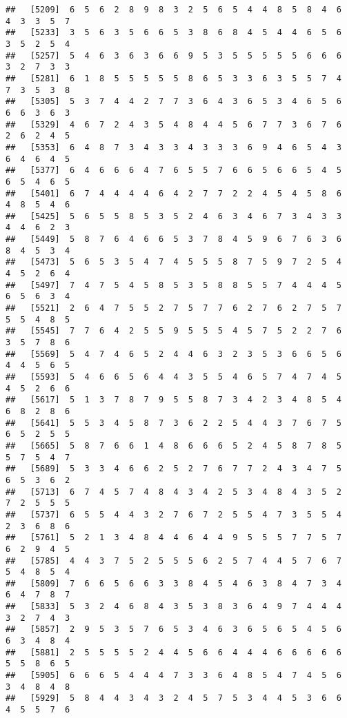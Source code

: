 \documentclass[
]{book}
\begin{document}
\begin{verbatim}
##   [5209]  6  5  6  2  8  9  8  3  2  5  6  5  4  4  8  5  8  4  6  4  3  3  5  7
##   [5233]  3  5  6  3  5  6  6  5  3  8  6  8  4  5  4  4  6  5  6  3  5  2  5  4
##   [5257]  5  4  6  3  6  3  6  6  9  5  3  5  5  5  5  5  6  6  6  3  2  7  3  3
##   [5281]  6  1  8  5  5  5  5  5  8  6  5  3  3  6  3  5  5  7  4  7  3  5  3  8
##   [5305]  5  3  7  4  4  2  7  7  3  6  4  3  6  5  3  4  6  5  6  6  6  3  6  3
##   [5329]  4  6  7  2  4  3  5  4  8  4  4  5  6  7  7  3  6  7  6  2  6  2  4  5
##   [5353]  6  4  8  7  3  4  3  3  4  3  3  3  6  9  4  6  5  4  3  6  4  6  4  5
##   [5377]  6  4  6  6  6  4  7  6  5  5  7  6  6  5  6  6  5  4  5  6  5  4  6  5
##   [5401]  6  7  4  4  4  4  6  4  2  7  7  2  2  4  5  4  5  8  6  4  8  5  4  6
##   [5425]  5  6  5  5  8  5  3  5  2  4  6  3  4  6  7  3  4  3  3  4  4  6  2  3
##   [5449]  5  8  7  6  4  6  6  5  3  7  8  4  5  9  6  7  6  3  6  8  4  5  3  4
##   [5473]  5  6  5  3  5  4  7  4  5  5  5  8  7  5  9  7  2  5  4  4  5  2  6  4
##   [5497]  7  4  7  5  4  5  8  5  3  5  8  8  5  5  7  4  4  4  5  6  5  6  3  4
##   [5521]  2  6  4  7  5  5  2  7  5  7  7  6  2  7  6  2  7  5  7  5  5  4  8  5
##   [5545]  7  7  6  4  2  5  5  9  5  5  5  4  5  7  5  2  2  7  6  3  5  7  8  6
##   [5569]  5  4  7  4  6  5  2  4  4  6  3  2  3  5  3  6  6  5  6  4  4  5  6  5
##   [5593]  5  4  6  6  5  6  4  4  3  5  5  4  6  5  7  4  7  4  5  4  5  2  6  6
##   [5617]  5  1  3  7  8  7  9  5  5  8  7  3  4  2  3  4  8  5  4  6  8  2  8  6
##   [5641]  5  5  3  4  5  8  7  3  6  2  2  5  4  4  3  7  6  7  5  6  5  2  5  5
##   [5665]  5  8  7  6  6  1  4  8  6  6  6  5  2  4  5  8  7  8  5  5  7  5  4  7
##   [5689]  5  3  3  4  6  6  2  5  2  7  6  7  7  2  4  3  4  7  5  6  5  3  6  2
##   [5713]  6  7  4  5  7  4  8  4  3  4  2  5  3  4  8  4  3  5  2  7  2  5  5  5
##   [5737]  6  5  5  4  4  3  2  7  6  7  2  5  5  4  7  3  5  5  4  2  3  6  8  6
##   [5761]  5  2  1  3  4  8  4  4  6  4  4  9  5  5  5  7  7  5  7  6  2  9  4  5
##   [5785]  4  4  3  7  5  2  5  5  5  6  2  5  7  4  4  5  7  6  7  5  4  8  5  4
##   [5809]  7  6  6  5  6  6  3  3  8  4  5  4  6  3  8  4  7  3  4  6  4  7  8  7
##   [5833]  5  3  2  4  6  8  4  3  5  3  8  3  6  4  9  7  4  4  4  3  2  7  4  3
##   [5857]  2  9  5  3  5  7  6  5  3  4  6  3  6  5  6  5  4  5  6  6  3  4  8  4
##   [5881]  2  5  5  5  5  2  4  4  5  6  6  4  4  4  6  6  6  6  6  5  5  8  6  5
##   [5905]  6  6  6  5  4  4  4  7  3  3  6  4  8  5  4  7  4  5  6  3  4  8  4  8
##   [5929]  5  8  4  4  3  4  3  2  4  5  7  5  3  4  4  5  3  6  6  4  5  5  7  6

\end{verbatim}
\end{document}
